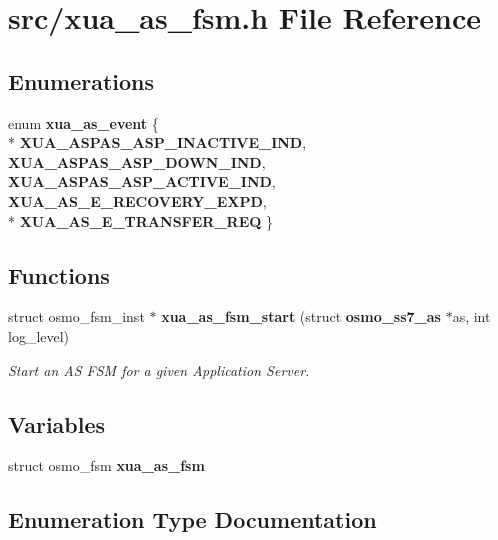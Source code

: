 \section{src/xua\+\_\+as\+\_\+fsm.h File Reference}
\label{xua__as__fsm_8h}
\subsection*{Enumerations}
\begin{DoxyCompactItemize}
\item 
enum {\bf xua\+\_\+as\+\_\+event} \{ \\*
{\bf X\+U\+A\+\_\+\+A\+S\+P\+A\+S\+\_\+\+A\+S\+P\+\_\+\+I\+N\+A\+C\+T\+I\+V\+E\+\_\+\+I\+ND}, 
{\bf X\+U\+A\+\_\+\+A\+S\+P\+A\+S\+\_\+\+A\+S\+P\+\_\+\+D\+O\+W\+N\+\_\+\+I\+ND}, 
{\bf X\+U\+A\+\_\+\+A\+S\+P\+A\+S\+\_\+\+A\+S\+P\+\_\+\+A\+C\+T\+I\+V\+E\+\_\+\+I\+ND}, 
{\bf X\+U\+A\+\_\+\+A\+S\+\_\+\+E\+\_\+\+R\+E\+C\+O\+V\+E\+R\+Y\+\_\+\+E\+X\+PD}, 
\\*
{\bf X\+U\+A\+\_\+\+A\+S\+\_\+\+E\+\_\+\+T\+R\+A\+N\+S\+F\+E\+R\+\_\+\+R\+EQ}
 \}
\end{DoxyCompactItemize}
\subsection*{Functions}
\begin{DoxyCompactItemize}
\item 
struct osmo\+\_\+fsm\+\_\+inst $\ast$ {\bf xua\+\_\+as\+\_\+fsm\+\_\+start} (struct {\bf osmo\+\_\+ss7\+\_\+as} $\ast$as, int log\+\_\+level)
\begin{DoxyCompactList}\small\item\em Start an AS F\+SM for a given Application Server. \end{DoxyCompactList}\end{DoxyCompactItemize}
\subsection*{Variables}
\begin{DoxyCompactItemize}
\item 
struct osmo\+\_\+fsm {\bf xua\+\_\+as\+\_\+fsm}
\end{DoxyCompactItemize}


\subsection{Enumeration Type Documentation}
